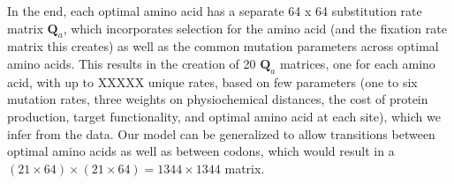 \documentclass{article}
\newcommand{\Qmatrix}{\mathbf{Q}\xspace}
\newcommand{\Qmatrixa}{\ensuremath{\Qmatrix_a}\xspace}
\begin{document}
In the end, each optimal amino acid has a separate 64 x 64 substitution rate matrix \Qmatrixa, which incorporates selection for the amino acid (and the fixation rate matrix this creates) as well as the common mutation parameters across optimal amino acids. 
This results in the creation of 20  \Qmatrixa  matrices, one for each amino acid, with up to XXXXX unique rates, based on few parameters (one to six mutation rates, three weights on physiochemical distances, the cost of protein production, target functionality, and optimal amino acid at each site), which we infer from the data.
Our model can be generalized to allow  transitions between optimal amino acids as well as between codons, which would result in a $(21 \times 64) \times (21 \times 64) =  1344 \times 1344$ matrix. 
\end{document}

